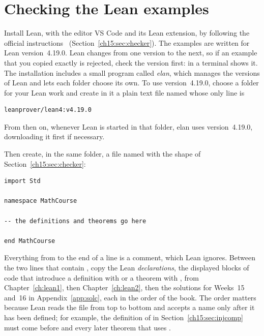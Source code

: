\section{Checking the Lean examples}\label{appD:sec:lean}
Install Lean, with the editor VS Code and its Lean extension, by following the official instructions~\cite{leaninstall} (Section~\ref{ch15:sec:checker}). The examples are written for Lean version~4.19.0. Lean changes from one version to the next, so if an example that you copied exactly is rejected, check the version first:  in a terminal shows it. The installation includes a small program called \emph{elan}, which manages the versions of Lean and lets each folder choose its own. To use version~4.19.0, choose a folder for your Lean work and create in it a plain text file named  whose only line is
\par\noindent\begin{minipage}{\linewidth}
\begin{lstlisting}
leanprover/lean4:v4.19.0
\end{lstlisting}
\end{minipage}\par
From then on, whenever Lean is started in that folder, elan uses version~4.19.0, downloading it first if necessary.

Then create, in the same folder, a file named  with the shape of Section~\ref{ch15:sec:checker}:
\par\noindent\begin{minipage}{\linewidth}
\begin{lstlisting}
import Std

namespace MathCourse

-- the definitions and theorems go here

end MathCourse
\end{lstlisting}
\end{minipage}\par
Everything from \code{-{}-} to the end of a line is a comment, which Lean ignores. Between the two lines that contain , copy the Lean \emph{declarations}, the displayed blocks of code that introduce a definition with  or a theorem with , from Chapter~\ref{ch:lean1}, then Chapter~\ref{ch:lean2}, then the solutions for Weeks~15 and~16 in Appendix~\ref{app:solc}, each in the order of the book. The order matters because Lean reads the file from top to bottom and accepts a name only after it has been defined; for example, the definition of  in Section~\ref{ch15:sec:injcomp} must come before  and every later theorem that uses .


